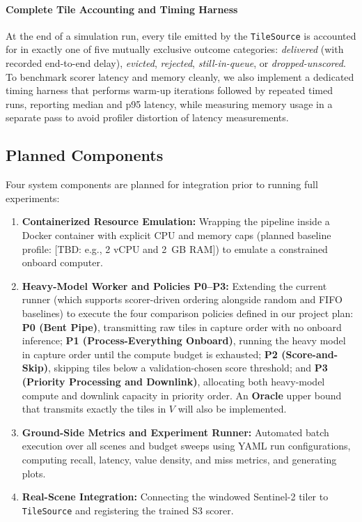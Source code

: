 \documentclass[conference]{IEEEtran}
\begin{document}
\paragraph{Complete Tile Accounting and Timing Harness}
At the end of a simulation run, every tile emitted by the \texttt{TileSource} is accounted for in exactly one of five mutually exclusive outcome categories: \emph{delivered} (with recorded end-to-end delay), \emph{evicted}, \emph{rejected}, \emph{still-in-queue}, or \emph{dropped-unscored}. To benchmark scorer latency and memory cleanly, we also implement a dedicated timing harness that performs warm-up iterations followed by repeated timed runs, reporting median and p95 latency, while measuring memory usage in a separate pass to avoid profiler distortion of latency measurements.

\subsection{Planned Components}
Four system components are planned for integration prior to running full experiments:
\begin{enumerate}
    \item \textbf{Containerized Resource Emulation:} Wrapping the pipeline inside a Docker container with explicit CPU and memory caps (planned baseline profile: [TBD: e.g., 2 vCPU and 2~GB RAM]) to emulate a constrained onboard computer.
    \item \textbf{Heavy-Model Worker and Policies P0--P3:} Extending the current runner (which supports scorer-driven ordering alongside random and FIFO baselines) to execute the four comparison policies defined in our project plan: \textbf{P0 (Bent Pipe)}, transmitting raw tiles in capture order with no onboard inference; \textbf{P1 (Process-Everything Onboard)}, running the heavy model in capture order until the compute budget is exhausted; \textbf{P2 (Score-and-Skip)}, skipping tiles below a validation-chosen score threshold; and \textbf{P3 (Priority Processing and Downlink)}, allocating both heavy-model compute and downlink capacity in priority order. An \textbf{Oracle} upper bound that transmits exactly the tiles in $V$ will also be implemented.
    \item \textbf{Ground-Side Metrics and Experiment Runner:} Automated batch execution over all scenes and budget sweeps using YAML run configurations, computing recall, latency, value density, and miss metrics, and generating plots.
    \item \textbf{Real-Scene Integration:} Connecting the windowed Sentinel-2 tiler to \texttt{TileSource} and registering the trained S3 scorer.
\end{enumerate}
\end{document}
